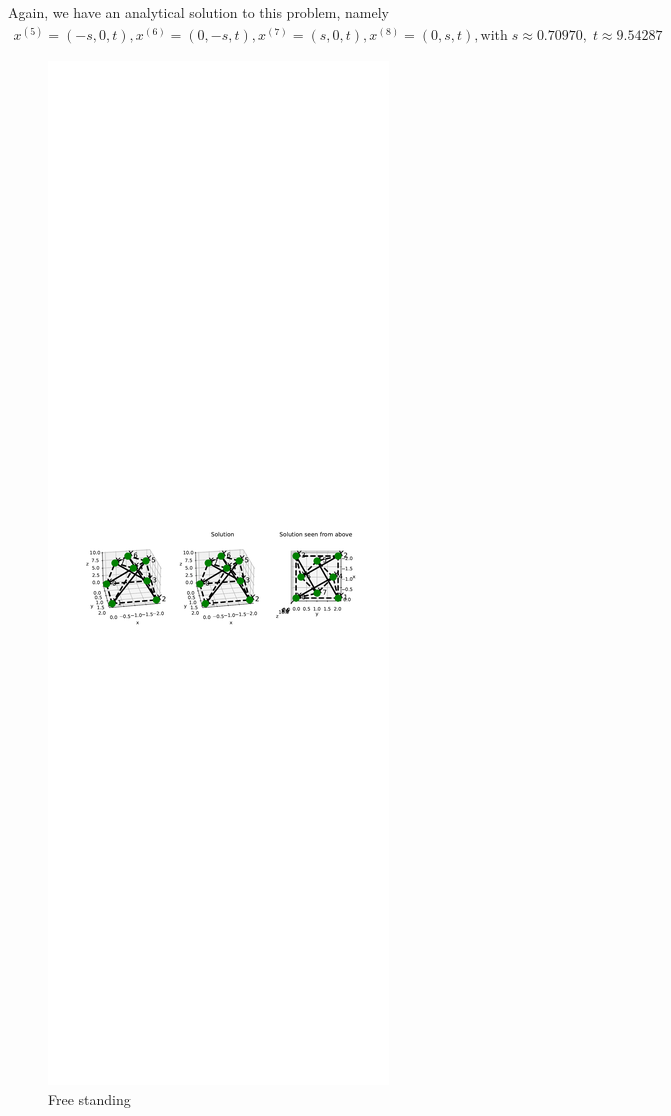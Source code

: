 Again, we have an analytical solution to this problem, namely 
\begin{equation*}
    \begin{gathered}
    x^{(5)} = (-s,0,t),x^{(6)} = (0,-s,t),x^{(7)} = (s,0,t),x^{(8)} = (0,s,t),  \text{with}\; s \approx 0.70970, \; t \approx 9.54287
    \end{gathered}
\end{equation*}

\begin{figure}
    \centering
    \includegraphics[width=0.6\columnwidth]{Bilder/FREESTANDING.pdf}
    \caption{Free standing}
    \label{fig:freestanding}
\end{figure}

